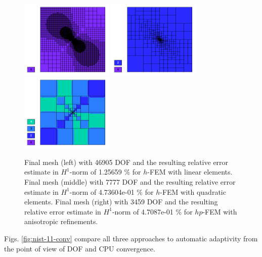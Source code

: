 \begin{figure}[!ht]
\centering
\includegraphics[height=3.7cm]{nist/nist-11/mesh_h1_aniso.png}
\includegraphics[height=3.7cm]{nist/nist-11/mesh_h2_aniso.png}
\includegraphics[height=3.7cm]{nist/nist-11/mesh_hp_aniso.png}
\caption{
Final mesh (left) with 46905 DOF and the resulting
relative error estimate in $H^1$-norm of 1.25659 \% for $h$-FEM with linear elements.
Final mesh (middle) with 7777 DOF and the resulting
relative error estimate in $H^1$-norm of 4.73604e-01 \% for $h$-FEM with quadratic elements.
Final mesh (right) with 3459 DOF and the resulting 
relative error estimate in $H^1$-norm of 4.7087e-01 \% for $hp$-FEM with anisotropic refinements.}
\label{fig:nist-11-hp-aniso}
\end{figure}


Figs. \ref{fig:nist-11-conv} compare all
three approaches to automatic adaptivity from the point
of view of DOF and CPU convergence.

